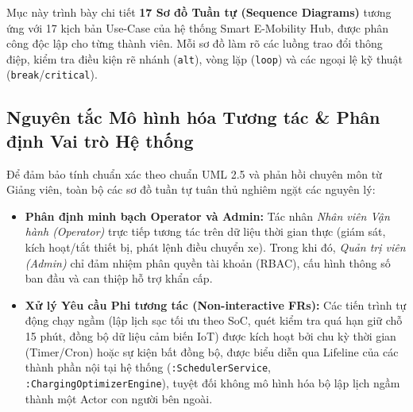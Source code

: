 \documentclass[12pt,a4paper]{article}
\begin{document}
Mục này trình bày chi tiết \textbf{17 Sơ đồ Tuần tự (Sequence Diagrams)} tương ứng với 17 kịch bản Use-Case của hệ thống Smart E-Mobility Hub, được phân công độc lập cho từng thành viên. Mỗi sơ đồ làm rõ các luồng trao đổi thông điệp, kiểm tra điều kiện rẽ nhánh (\texttt{alt}), vòng lặp (\texttt{loop}) và các ngoại lệ kỹ thuật (\texttt{break}/\texttt{critical}).

\subsection*{Nguyên tắc Mô hình hóa Tương tác \& Phân định Vai trò Hệ thống}
Để đảm bảo tính chuẩn xác theo chuẩn UML 2.5 và phản hồi chuyên môn từ Giảng viên, toàn bộ các sơ đồ tuần tự tuân thủ nghiêm ngặt các nguyên lý:
\begin{itemize}[nosep]
    \item \textbf{Phân định minh bạch Operator và Admin:} Tác nhân \textit{Nhân viên Vận hành (Operator)} trực tiếp tương tác trên dữ liệu thời gian thực (giám sát, kích hoạt/tắt thiết bị, phát lệnh điều chuyển xe). Trong khi đó, \textit{Quản trị viên (Admin)} chỉ đảm nhiệm phân quyền tài khoản (RBAC), cấu hình thông số ban đầu và can thiệp hỗ trợ khẩn cấp.
    \item \textbf{Xử lý Yêu cầu Phi tương tác (Non-interactive FRs):} Các tiến trình tự động chạy ngầm (lập lịch sạc tối ưu theo SoC, quét kiểm tra quá hạn giữ chỗ 15 phút, đồng bộ dữ liệu cảm biến IoT) được kích hoạt bởi chu kỳ thời gian (Timer/Cron) hoặc sự kiện bất đồng bộ, được biểu diễn qua Lifeline của các thành phần nội tại hệ thống (\texttt{:SchedulerService}, \texttt{:ChargingOptimizerEngine}), tuyệt đối không mô hình hóa bộ lập lịch ngầm thành một Actor con người bên ngoài.
\end{itemize}
\end{document}
